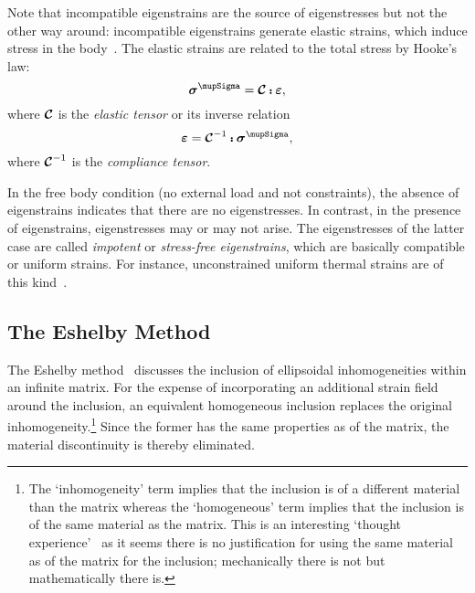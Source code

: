 Note that incompatible eigenstrains are the source of eigenstresses but not the other way around: incompatible eigenstrains generate elastic strains, which induce stress in the body~\autocite{Korsunsky.2017f}. The elastic strains are related to the total stress by Hooke's law:
\begin{equation}
\tenb{\sigma}^\mupSigma=\tend{C}\dscp \tenb{\varepsilon},\label{eq:eigenhooke}
\end{equation}
where $\mathord{\mbox{\boldmath$\mathcal{C}$}}$ is the \textit{elastic tensor} or its inverse relation
\begin{equation}
\tenb{\varepsilon}=\tend{C}^\inv\dscp \tenb{\sigma}^\mupSigma,
\end{equation}
where $\mathord{\mbox{\boldmath$\mathcal{C}$}}^{-1}$ is the \textit{compliance tensor}.

In the free body condition (no external load and not constraints), the absence of eigenstrains indicates that there are no eigenstresses. In contrast, in the presence of eigenstrains, eigenstresses may or may not arise. The eigenstresses of the latter case are called \textit{impotent} or \textit{stress-free eigenstrains}, which are basically compatible or uniform strains. For instance, unconstrained uniform thermal strains are of this kind~\autocite{Korsunsky.2008}. 

\subsection{The Eshelby Method}
	The Eshelby method~\autocite{Eshelby.1957,Eshelby.1961} discusses the inclusion of ellipsoidal inhomogeneities within an infinite matrix. For the expense of incorporating an additional strain field around the inclusion, an equivalent homogeneous inclusion replaces the original inhomogeneity.\footnote{The `inhomogeneity' term implies that the inclusion is of a different material than the matrix whereas the `homogeneous' term implies that the inclusion is of the same material as the matrix. This is an interesting `thought experience'~\autocite[p.~89]{Clyne.2019} as it seems there is no justification for using the same material as of the matrix for the inclusion; mechanically there is not but mathematically there is.} Since the former has the same properties as of the matrix, the material discontinuity is thereby eliminated.
	
